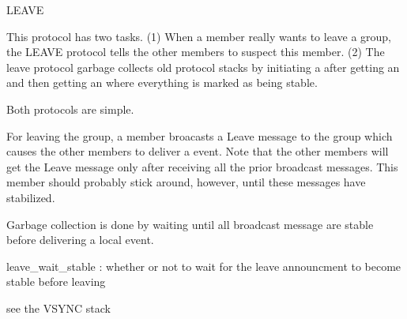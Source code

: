 %
%
%
\begin{Layer}{LEAVE}

This protocol has two tasks.  (1) When a member really wants to leave a group,
the LEAVE protocol tells the other members to suspect this member.  (2) The
leave protocol garbage collects old protocol stacks by initiating a 
after getting an  and then getting an  where everything is
marked as being stable.

\begin{Protocol}
Both protocols are simple.

For leaving the group, a member broacasts a Leave message to the group
which causes the other members to deliver a  event.  Note that
the other members will get the Leave message only after receiving all the
prior broadcast messages.  This member should probably stick around,
however, until these messages have stabilized.

Garbage collection is done by waiting until all broadcast message are
stable before delivering a local  event.
\end{Protocol}

\begin{Parameters}
\item
leave\_wait\_stable : whether or not to wait for the leave announcment to
become stable before leaving
\end{Parameters}

\begin{Properties}
\item \todo{}
\end{Properties}

\begin{Sources}
\end{Sources}

\begin{GenEvent}
\end{GenEvent}

\begin{Testing}
\item see the VSYNC stack
\end{Testing}
\end{Layer}
